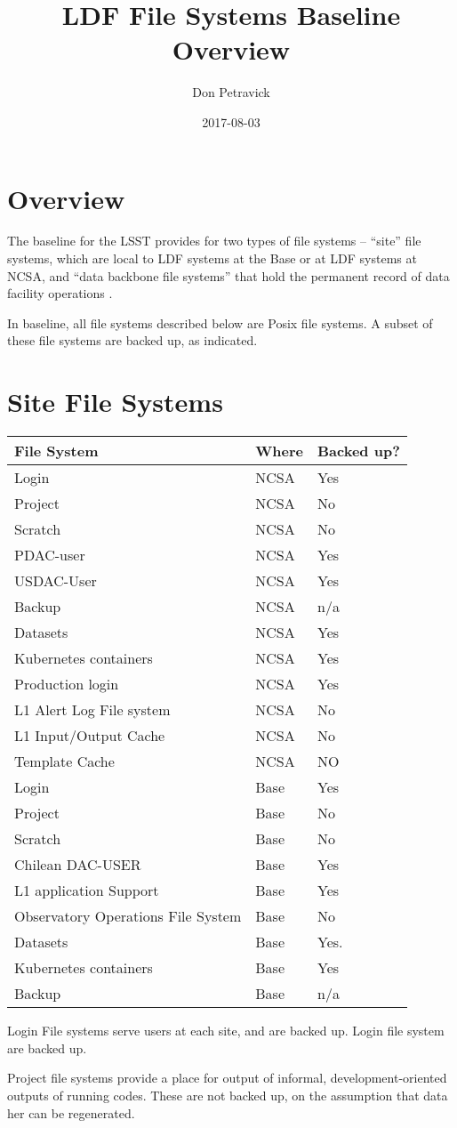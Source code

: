 \documentclass[toc,DM,lsstdraft]{lsstdoc}
\title{LDF File Systems Baseline Overview}
\author{Don Petravick}
\date{2017-08-03}
\begin{document}
\maketitle

\section{Overview}

The baseline for the LSST provides for two types of file systems --
``site'' file systems, which are local to LDF systems at the Base or at
LDF systems at NCSA, and ``data backbone file systems'' that hold the
permanent record of data facility operations .

In baseline, all file systems described below are Posix file systems. A
subset of these file systems are backed up, as indicated.

\section{Site File Systems}

\begin{longtable}[]{@{}lll@{}}
\hline
\textbf{File System} & \textbf{Where} & \textbf{Backed up?}\tabularnewline
\hline
\endhead
Login & NCSA & Yes\tabularnewline
Project & NCSA & No\tabularnewline
Scratch & NCSA & No\tabularnewline
PDAC-user & NCSA & Yes\tabularnewline
USDAC-User & NCSA & Yes\tabularnewline
Backup & NCSA & n/a\tabularnewline
Datasets & NCSA & Yes\tabularnewline
Kubernetes containers & NCSA & Yes\tabularnewline
Production login & NCSA & Yes\tabularnewline
L1 Alert Log File system & NCSA & No\tabularnewline
L1 Input/Output Cache & NCSA & No\tabularnewline
Template Cache & NCSA & NO\tabularnewline
Login & Base & Yes\tabularnewline
Project & Base & No\tabularnewline
Scratch & Base & No\tabularnewline
Chilean DAC-USER & Base & Yes\tabularnewline
L1 application Support & Base & Yes\tabularnewline
Observatory Operations File System & Base & No\tabularnewline
Datasets & Base & Yes.\tabularnewline
Kubernetes containers & Base & Yes\tabularnewline
Backup & Base & n/a\tabularnewline
\hline
\end{longtable}

Login File systems serve users at each site, and are backed up. Login
file system are backed up.

Project file systems provide a place for output of informal,
development-oriented outputs of running codes. These are not backed up,
on the assumption that data her can be regenerated.
\end{document}
